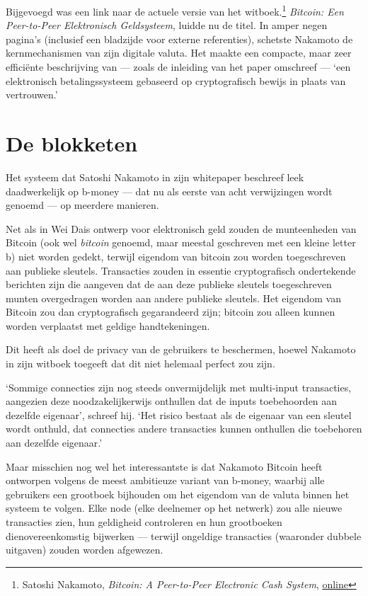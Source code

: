 \documentclass[
  a5paper,
  smalldemyvopaper,11pt,twoside,onecolumn,openright,extrafontsizes,
hidelinks]{memoir}
\begin{document}
Bijgevoegd was een link naar de actuele versie van het
witboek.\footnote{Satoshi Nakamoto, \emph{Bitcoin: A Peer-to-Peer
  Electronic Cash System},
  \href{https://bitcoin.org/bitcoin.pdf}{online}} \emph{Bitcoin: Een
Peer-to-Peer Elektronisch Geldsysteem}, luidde nu de titel. In amper
negen pagina's (inclusief een bladzijde voor externe referenties),
schetste Nakamoto de kernmechanismen van zijn digitale valuta. Het
maakte een compacte, maar zeer efficiënte beschrijving van --- zoals de
inleiding van het paper omschreef --- `een elektronisch betalingssysteem
gebaseerd op cryptografisch bewijs in plaats van vertrouwen.'

\section{De blokketen}\label{de-blokketen}

Het systeem dat Satoshi Nakamoto in zijn whitepaper beschreef leek
daadwerkelijk op b-money --- dat nu als eerste van acht verwijzingen
wordt genoemd --- op meerdere manieren.

Net als in Wei Dais ontwerp voor elektronisch geld zouden de
munteenheden van Bitcoin (ook wel \emph{bitcoin} genoemd, maar meestal
geschreven met een kleine letter b) niet worden gedekt, terwijl eigendom
van bitcoin zou worden toegeschreven aan publieke sleutels. Transacties
zouden in essentie cryptografisch ondertekende berichten zijn die
aangeven dat de aan deze publieke sleutels toegeschreven munten
overgedragen worden aan andere publieke sleutels. Het eigendom van
Bitcoin zou dan cryptografisch gegarandeerd zijn; bitcoin zou alleen
kunnen worden verplaatst met geldige handtekeningen.

Dit heeft als doel de privacy van de gebruikers te beschermen, hoewel
Nakamoto in zijn witboek toegeeft dat dit niet helemaal perfect zou
zijn.

`Sommige connecties zijn nog steeds onvermijdelijk met multi-input
transacties, aangezien deze noodzakelijkerwijs onthullen dat de inputs
toebehoorden aan dezelfde eigenaar', schreef hij. `Het risico bestaat
als de eigenaar van een sleutel wordt onthuld, dat connecties andere
transacties kunnen onthullen die toebehoren aan dezelfde eigenaar.'

Maar misschien nog wel het interessantste is dat Nakamoto Bitcoin heeft
ontworpen volgens de meest ambitieuze variant van b-money, waarbij alle
gebruikers een grootboek bijhouden om het eigendom van de valuta binnen
het systeem te volgen. Elke node (elke deelnemer op het netwerk) zou
alle nieuwe transacties zien, hun geldigheid controleren en hun
grootboeken dienovereenkomstig bijwerken --- terwijl ongeldige
transacties (waaronder dubbele uitgaven) zouden worden afgewezen.
\end{document}
